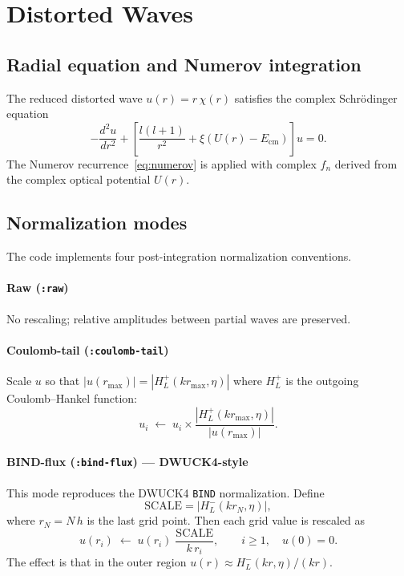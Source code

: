 \documentclass[12pt,a4paper]{article}
\begin{document}
\section{Distorted Waves}

\subsection{Radial equation and Numerov integration}

The reduced distorted wave $u(r) = r\,\chi(r)$ satisfies the complex
Schrödinger equation
\begin{equation}
  -\frac{d^2 u}{dr^2} + \left[
    \frac{l(l+1)}{r^2}
    + \xi\!\left(U(r) - E_\mathrm{cm}\right)
  \right]u = 0.
  \label{eq:distorted-schrodinger}
\end{equation}
The Numerov recurrence~\eqref{eq:numerov} is applied with complex
$f_n$ derived from the complex optical potential $U(r)$.

\subsection{Normalization modes}

The code implements four post-integration normalization conventions.

\paragraph{Raw (\texttt{:raw})}
No rescaling; relative amplitudes between partial waves are preserved.

\paragraph{Coulomb-tail (\texttt{:coulomb-tail})}
Scale $u$ so that $|u(r_\mathrm{max})| = |H_L^+(k r_\mathrm{max},\eta)|$
where $H_L^+$ is the outgoing Coulomb–Hankel function:
\begin{equation}
  u_i \;\longleftarrow\; u_i \times \frac{|H_L^+(k r_\mathrm{max},\eta)|}{|u(r_\mathrm{max})|}.
\end{equation}

\paragraph{BIND-flux (\texttt{:bind-flux}) — DWUCK4-style}
This mode reproduces the DWUCK4 \texttt{BIND} normalization.
Define
\begin{equation}
  \mathrm{SCALE} = |H_L^-(k r_N, \eta)|,
\end{equation}
where $r_N = N\,h$ is the last grid point.  Then each grid value is
rescaled as
\begin{equation}
  u(r_i) \;\longleftarrow\; u(r_i)\;\frac{\mathrm{SCALE}}{k\,r_i},
  \qquad i \ge 1, \quad u(0)=0.
  \label{eq:bind-flux}
\end{equation}
The effect is that in the outer region $u(r) \approx H_L^-(kr,\eta)/(kr)$.
\end{document}
